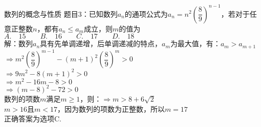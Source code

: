 \documentclass[aspectratio=169]{ctexbeamer} %
\date{\today}
\begin{document}
\begin{frame}[t]{数列的概念与性质}
题目3：已知数列${a_n}$的通项公式为$a_n = n^2(\dfrac{8}{9})^{n-1}$，若对于任意正整数$n$，都有$a_n \le a_m$成立，则$m$的值为 \\
$A. \quad 15 \qquad B. \quad 16 \qquad C. \quad 17 \qquad D. \quad 18$ \\
\pause
解：数列${a_n}$具有先单调递增，后单调递减的特点，$a_m$为最大值，有：$a_{m} > a_{m+1}$ \\
\pause
$\Rightarrow m^2 \left(\dfrac{8}{9} \right)^{m-1} - (m+1)^2 \left(\dfrac{8}{9} \right)^{m} > 0$ \\
\pause
$\Rightarrow 9m^2 - 8(m+1)^2 > 0$ \\
\pause
$\Rightarrow m^2 - 16m - 8 > 0$ \\
\pause
$\Rightarrow (m - 8)^2 - 72 > 0$ \\
\pause
数列的项数$m$满足$m \ge 1$，则：$\Rightarrow m > 8 + 6\sqrt{2}$ \\
\pause
$m > 16$且$m<17$，因为数列的项数为正整数，所以$m = 17$ \\
正确答案为选项C.
\end{frame}
\end{document}
